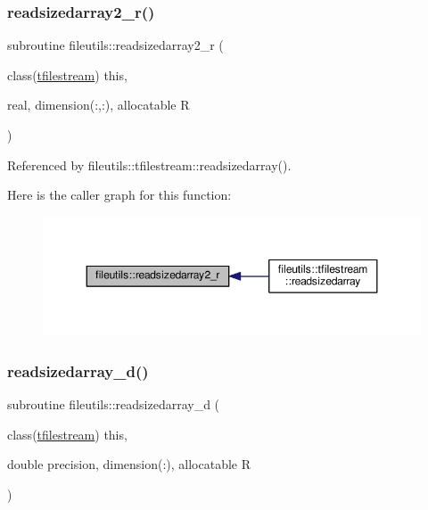 \subsubsection{\texorpdfstring{readsizedarray2\+\_\+r()}{readsizedarray2\_r()}}
{\footnotesize\ttfamily subroutine fileutils\+::readsizedarray2\+\_\+r (\begin{DoxyParamCaption}\item[{class(\mbox{\hyperlink{structfileutils_1_1tfilestream}{tfilestream}})}]{this,  }\item[{real, dimension(\+:,\+:), allocatable}]{R }\end{DoxyParamCaption})\hspace{0.3cm}{\ttfamily [private]}}



Referenced by fileutils\+::tfilestream\+::readsizedarray().

Here is the caller graph for this function\+:
\nopagebreak
\begin{figure}[H]
\begin{center}
\leavevmode
\includegraphics[width=348pt]{namespacefileutils_a7fd8e6d80f0ccadb1d773d86d8871816_icgraph}
\end{center}
\end{figure}
\mbox{\label{namespacefileutils_ab663b9fbd43f12bd0ad8fdda4c1ff85e}} 
\subsubsection{\texorpdfstring{readsizedarray\+\_\+d()}{readsizedarray\_d()}}
{\footnotesize\ttfamily subroutine fileutils\+::readsizedarray\+\_\+d (\begin{DoxyParamCaption}\item[{class(\mbox{\hyperlink{structfileutils_1_1tfilestream}{tfilestream}})}]{this,  }\item[{double precision, dimension(\+:), allocatable}]{R }\end{DoxyParamCaption})\hspace{0.3cm}{\ttfamily [private]}}




